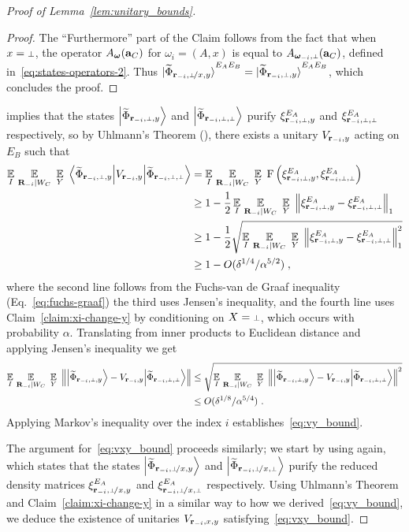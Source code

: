 \begin{proof}[Proof of Lemma~\ref{lem:unitary_bounds}]
\begin{proof}
The ``Furthermore'' part of the Claim follows from the fact that when $x = \dummy$, the operator $A_{\boldsymbol{\omega}}(\mathbf{a}_C)$ for $\omega_i = (A,x)$ is equal to $A_{\bomega_\mi,\dummy}(\ba_C)$, defined in~\eqref{eq:states-operators-2}. Thus $\ket{\wt{\Phi}_\sspxy}^{E_A E_B} = \ket{\wt{\Phi}_\sspy}^{E_A E_B}$, which concludes the proof.
\end{proof}

 implies that the states $\bigket{\wt{\Phi}_\sspy}$ and $\bigket{\wt{\Phi}_\sspp}$ purify $\xi^{E_A}_\sspy$ and $\xi^{E_A}_\sspp$ respectively, so by Uhlmann's Theorem (), there exists a unitary $V_{\mathbf{r}_{-i}, y}$ acting on $E_B$ such that 
\begin{align}
	\Ex_I \, \Ex_{\bR_\mi |  W_C} \, \, \Ex_{Y} \,\,  \bigbra{\wt{\Phi}_\sspy } V_{\br_\mi, y}  \bigket{\wt{\Phi}_\sspp}  
	&= \Ex_I \, \Ex_{\bR_\mi |  W_C} \, \, \Ex_{Y}  \,\, \F \left (\xi_\sspy^{E_A}, \xi_\sspp^{E_A} \right)  \notag \\
	& \geq 1 - \frac{1}{2} \Ex_I \, \Ex_{\bR_\mi |  W_C} \, \, \Ex_{Y}  \,\,  \Big \| \xi^{E_A}_\sspy - \xi^{E_A}_\sspp \Big \|_1 \notag \\
	&\geq 1 - \frac{1}{2} \sqrt {\Ex_I \, \Ex_{\bR_\mi |  W_C} \, \, \Ex_{Y}  \,\,  \Big \| \xi^{E_A}_\sspy - \xi^{E_A}_\sspp \Big \|_1^2} \notag \\
	& \geq 1 - O(\delta^{1/4}/\alpha^{5/2})\;,
\end{align}
where the second line follows from the Fuchs-van de Graaf inequality (Eq.~\eqref{eq:fuchs-graaf}) the third uses Jensen's inequality, and the fourth line uses Claim~\ref{claim:xi-change-y} by conditioning on $X = \dummy$, which occurs with probability $\alpha$. Translating from inner products to Euclidean distance and applying Jensen's inequality we get
\begin{align*}
	\Ex_I \, \Ex_{\bR_\mi |  W_C} \, \, \Ex_{Y} \,\,   \left \| \bigket{\wt{\Phi}_\sspy } - V_{\br_\mi, y}  \bigket{\wt{\Phi}_\sspp}  \right \|& \leq \sqrt{\Ex_I \, \Ex_{\bR_\mi |  W_C} \, \, \Ex_{Y} \,\,   \left \| \bigket{\wt{\Phi}_\sspy } - V_{\br_\mi, y}  \bigket{\wt{\Phi}_\sspp}  \right \|^2}\\ &\leq O(\delta^{1/8}/\alpha^{5/4})~.
\end{align*}
Applying Markov's inequality over the index $i$ establishes~\eqref{eq:vy_bound}.

The argument for~\eqref{eq:vxy_bound} proceeds similarly; we start by using  again, which states that the states $\bigket{\wt{\Phi}_\sspxy}$ and $\bigket{\wt{\Phi}_\sspxp}$ purify the reduced density matrices $\xi^{E_A}_\sspxy$ and $\xi^{E_A}_\sspxp$ respectively. Using Uhlmann's Theorem and Claim~\ref{claim:xi-change-y} in a similar way to how we derived~\eqref{eq:vy_bound}, we deduce the existence of unitaries $V_{{\mathbf{r}_{-i} , x,y}}$ satisfying~\eqref{eq:vxy_bound}.


\end{proof}
